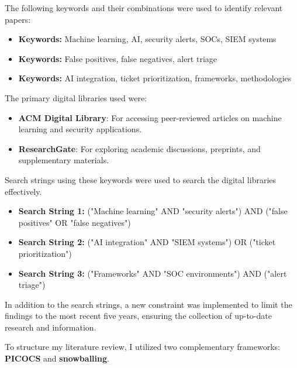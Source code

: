 The following keywords and their combinations were used to identify relevant papers:
\begin{itemize}
    \item \textbf{Keywords:} Machine learning, AI, security alerts, SOCs, SIEM systems
    \item \textbf{Keywords:} False positives, false negatives, alert triage
    \item \textbf{Keywords:} AI integration, ticket prioritization, frameworks, methodologies
\end{itemize}

The primary digital libraries used were:
\begin{itemize}
    \item \textbf{ACM Digital Library}: For accessing peer-reviewed articles on machine learning and security applications.
    \item \textbf{ResearchGate}: For exploring academic discussions, preprints, and supplementary materials.
\end{itemize}

Search strings using these keywords were used to search the digital libraries effectively.
\begin{itemize}
    \item \textbf{Search String 1:} ("Machine learning" AND "security alerts") AND ("false positives" OR "false negatives")
    \item \textbf{Search String 2:} ("AI integration" AND "SIEM systems") OR ("ticket prioritization")
    \item \textbf{Search String 3:} ("Frameworks" AND "SOC environments") AND ("alert triage")
\end{itemize}

In addition to the search strings, a new constraint was implemented to limit the findings to the most recent five years, ensuring the collection of up-to-date research and information.

To structure my literature review, I utilized two complementary frameworks: \textbf{PICOCS} and \textbf{snowballing}.

